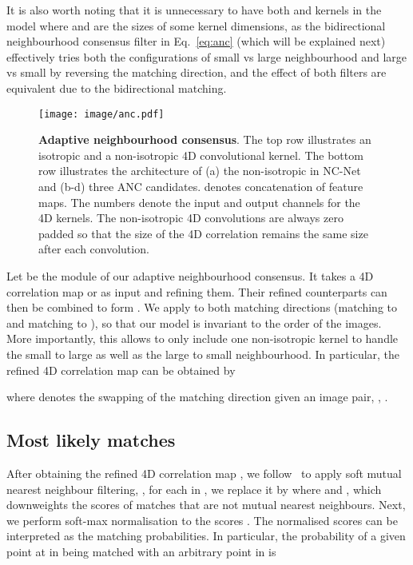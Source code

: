 \documentclass[10pt,twocolumn,letterpaper]{article}
\begin{document}
It is also worth noting that it is unnecessary to have both  and  kernels in the model where  and  are the sizes of some kernel dimensions, as the bidirectional neighbourhood consensus filter in Eq.~\ref{eq:anc} (which will be explained next) effectively tries both the configurations of small vs large neighbourhood and large vs small by reversing the matching direction, and the effect of both filters are equivalent due to the bidirectional matching. 



\begin{figure}[t]
\begin{center}
  \texttt{[image: image/anc.pdf]}
\end{center}
  \caption{\textbf{Adaptive neighbourhood consensus}. The top row illustrates an isotropic and a non-isotropic 4D convolutional kernel. The bottom row illustrates the architecture of (a) the non-isotropic in NC-Net~\cite{Rocco_NIPS18_NCNet}  and (b-d) three ANC candidates.  denotes concatenation of feature maps. The numbers  denote the input and output channels for the 4D kernels. 
  The non-isotropic 4D convolutions are always zero padded so that the size of the 4D correlation remains the same size after each convolution. 
  } 
\label{fig:anc}
\end{figure}


Let  be the module of our adaptive neighbourhood consensus. It takes a 4D correlation map  or  as input and refining them.
Their refined counterparts can then be combined to form .
We apply  to both matching directions (\ie matching  to  and matching  to ), so that our model is invariant to the order of the images.
More importantly, this allows  to only include one  non-isotropic kernel to handle the small to large as well as the large to small neighbourhood.
In particular, the refined 4D correlation map can be obtained by 


where  denotes the swapping of the matching direction given an image pair, \ie, .

\subsection{Most likely matches}
\label{sec:map}
After obtaining the refined 4D correlation map , we follow~\cite{Rocco_NIPS18_NCNet} to apply soft mutual nearest neighbour filtering, \ie, for each  in , we replace it by  where  and , which downweights the scores of matches that are not mutual nearest neighbours. Next, we perform soft-max normalisation to the scores .
The normalised scores can be interpreted as the matching probabilities.
In particular, the probability of a given point at  in  being matched with an arbitrary point   in  is
\end{document}
